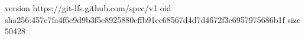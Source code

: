 version https://git-lfs.github.com/spec/v1
oid sha256:457e7fa4f6e9d9b3f5e8925880cffb91cc68567d4d7d4672f3c6957975686b1f
size 50428
